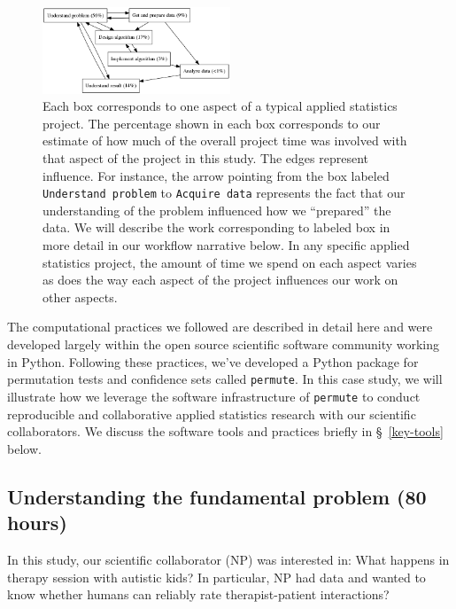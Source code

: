 \documentclass[]{article}
\begin{document}
\begin{figure}[h]
  \centering
    \includegraphics[width=0.5\textwidth]{work_process.png}
  \caption{
  \setlength{\leftskip}{1cm}
  \setlength{\rightskip}{1cm}
  \small
           Each box corresponds to one aspect of a typical applied
           statistics project.
           The percentage shown in each box corresponds to
           our estimate of how much of the overall project time was involved
           with that aspect of the project in this study.
           The edges represent influence.
           For instance,
           the arrow pointing from the box labeled \texttt{Understand problem}
           to \texttt{Acquire data} represents the fact that our understanding
           of the problem influenced how we ``prepared'' the data.
           We will describe
           the work corresponding to labeled box in more detail in our
           workflow narrative below.
           In any specific applied statistics project,
           the amount of time we spend on each aspect varies as does the
           way each aspect of the project influences our work on other
           aspects.}\label{fig:work_process}
\end{figure}


The computational practices we followed are described in detail here
\cite{millman2014developing} and were developed largely within the open source
scientific software community working in Python.
Following these practices, we've developed a Python package for permutation
tests and confidence sets called \texttt{permute}.
In this case study, we will illustrate how we leverage the software
infrastructure of \texttt{permute} to conduct reproducible and collaborative
applied statistics research with our scientific collaborators.
We discuss the software tools and practices briefly in \S~\ref{key-tools}
below.

\subsection{Understanding the fundamental problem (80 hours)}

In this study, our scientific collaborator (NP) was interested in:  What
happens in therapy session with autistic kids?
In particular, NP had data and wanted to know whether humans can reliably rate
therapist-patient interactions?
\end{document}
